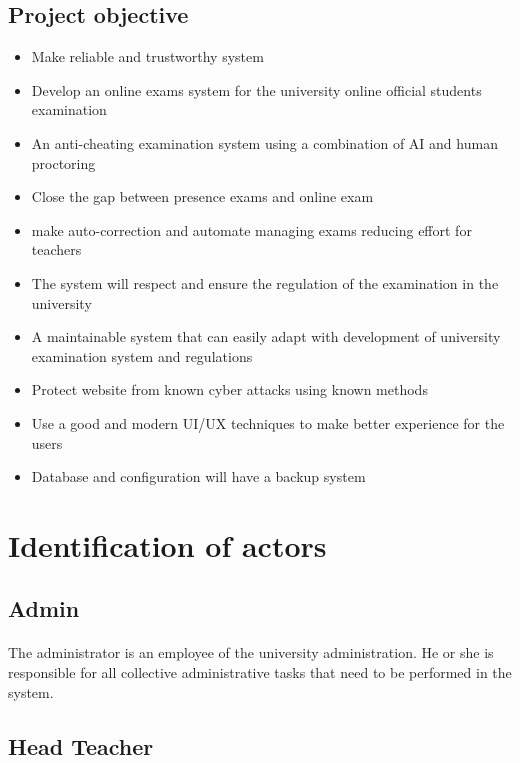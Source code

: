 \documentclass[]{uc2pfecaneva}
\begin{document}
    \subsection{Project objective}

    \begin{itemize}
        \item Make reliable and trustworthy system
        \item Develop an online exams system for the university online official students examination
        \item An anti-cheating examination system using a combination of AI and human proctoring
        \item Close the gap between presence exams and online exam
        \item make auto-correction and automate managing exams reducing effort for teachers
        \item The system will respect and ensure the regulation of the examination in the university
        \item A maintainable system that can easily adapt  with development of university examination system and regulations
        \item Protect website from known cyber attacks using known methods
        \item Use a good and modern UI/UX techniques to make better experience for the users
        \item Database and configuration will have a backup system
    \end{itemize}

    \raggedright\section{Identification of actors}
    \raggedright\subsection{Admin}
    \paragraph{}
    The administrator is an employee of the university administration. He or she is responsible for all collective administrative tasks that need to be performed in the system.

    \raggedright\subsection{Head Teacher}
\end{document}
